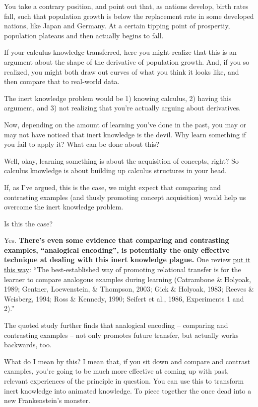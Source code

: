 You take a contrary position, and point out that, as nations develop,
birth rates fall, such that population growth is below the replacement
rate in some developed nations, like Japan and Germany. At a certain
tipping point of prospertiy, population plateaus and then actually
begins to fall.

If your calculus knowledge transferred, here you might realize that this
is an argument about the shape of the derivative of population growth.
And, if you so realized, you might both draw out curves of what you
think it looks like, and then compare that to real-world data.

The inert knowledge problem would be 1) knowing calculus, 2) having this
argument, and 3) not realizing that you're actually arguing about
derivatives.

Now, depending on the amount of learning you've done in the past, you
may or may not have noticed that inert knowledge is the devil. Why learn
something if you fail to apply it? What can be done about this?

Well, okay, learning something is about the acquisition of concepts,
right? So calculus knowledge is about building up calculus structures in
your head.

If, as I've argued, this is the case, we might expect that comparing and
contrasting examples (and thusly promoting concept acquisition) would
help us overcome the inert knowledge problem.

Is this the case?

Yes. \textbf{There's even some evidence that comparing and contrasting
examples, ``analogical encoding'', is potentially the only effective
technique at dealing with this inert knowledge plague.} One review
\href{http://onlinelibrary.wiley.com/doi/10.1111/j.1551-6709.2009.01070.x/full}{put
it this way}: ``The best-established way of promoting relational
transfer is for the learner to compare analogous examples during
learning (Catrambone \& Holyoak, 1989; Gentner, Loewenstein, \&
Thompson, 2003; Gick \& Holyoak, 1983; Reeves \& Weisberg, 1994; Ross \&
Kennedy, 1990; Seifert et al., 1986, Experiments 1 and 2).''

The quoted study further finds that analogical encoding -- comparing and
contrasting examples -- not only promotes future transfer, but actually
works backwards, too.

What do I mean by this? I mean that, if you sit down and compare and
contrast examples, you're going to be much more effective at coming up
with past, relevant experiences of the principle in question. You can
use this to transform inert knowledge into animated knowledge. To piece
together the once dead into a new Frankenstein's monster.

